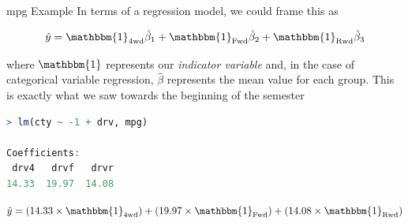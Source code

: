 \documentclass{beamer}
\begin{document}
\begin{frame}[fragile]{mpg Example}
In terms of a regression model, we could frame this as

\begin{align*}
\hat{y} = \mathbbm{1}_{\text{4wd}} \hat{\beta}_1 + \mathbbm{1}_{\text{Fwd}} \hat{\beta}_2 + \mathbbm{1}_{\text{Rwd}} \hat{\beta}_3
\end{align*}

where $\mathbbm{1}$ represents our \textit{indicator variable} and, in the case of categorical variable regression, $\hat{\beta}$ represents the mean value for each group. This is exactly what we saw towards the beginning of the semester \vspace{2mm}

\begin{lstlisting}[language=R]
> lm(cty ~ -1 + drv, mpg)

Coefficients:
 drv4   drvf   drvr  
14.33  19.97  14.08  
\end{lstlisting}
\begin{center}
$\hat{y} = (14.33 \times \mathbbm{1}_{\text{4wd}})  + (19.97 \times \mathbbm{1}_{\text{Fwd}})  + (14.08 \times \mathbbm{1}_{\text{Rwd}})$
\end{center}

\end{frame}
\end{document}
